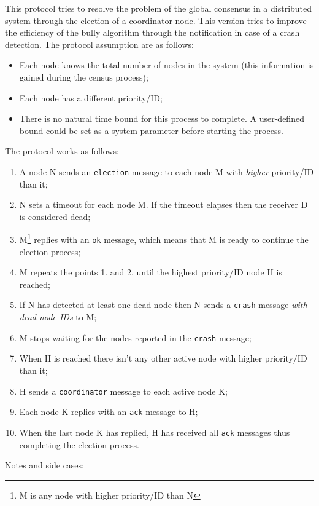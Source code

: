 This protocol tries to resolve the problem of the global consensus in a distributed system through the election
of a coordinator node. This version tries to improve the efficiency of the bully algorithm through the notification in case of a crash detection. The protocol assumption are as follows:
\begin{itemize}
  \item Each node knows the total number of nodes in the system (this information is gained during the census process);
  \item Each node has a different priority/ID;
  \item There is no natural time bound for this process to complete. A user-defined bound could be set as a system parameter before starting the process.
\end{itemize}
The protocol works as follows:
\begin{enumerate}
  \item A node N sends an \texttt{election} message to each node M with \textit{higher} priority/ID than it;
  \item N sets a timeout for each node M. If the timeout elapses then the receiver D is considered dead;
  \item M\footnote{M is any node with higher priority/ID than N} replies with an \texttt{ok} message, which means that M is ready to continue the election process;
  \item M repeats the points 1. and 2. until the highest priority/ID node H is reached;
  \item If N has detected at least one dead node then N sends a \texttt{crash} message \textit{with dead node IDs} to M;
  \item M stops waiting for the nodes reported in the \texttt{crash} message;
  \item When H is reached there isn't any other active node with higher priority/ID than it;
  \item H sends a \texttt{coordinator} message to each active node K;
  \item Each node K replies with an \texttt{ack} message to H;
  \item When the last node K has replied, H has received all \texttt{ack} messages thus completing the election process.
\end{enumerate}
Notes and side cases:
